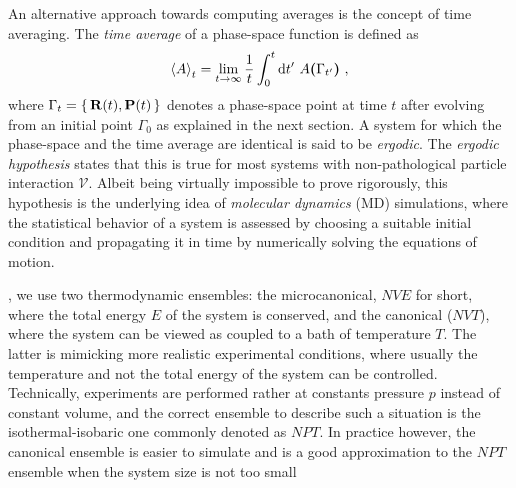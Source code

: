 An alternative approach towards computing averages is the concept of time averaging. The \emph{time average} of a phase-space function is defined as
\begin{align}
  \braket{A}_t
    = \lim\limits_{t \to \infty} \frac{1}{t} \int_0^t \d t' ~ A {\bm (} \Gamma_{t'} {\bm )}~,
  \label{eq:time.average}
\end{align}
where $\Gamma_t = \set{ {\bf R} (t), {\bf P} (t)}$ denotes a phase-space point at time $t$ after evolving from an initial point $\Gamma_0$ as explained in the next section.
A system for which the phase-space and the time average are identical is said to be \emph{ergodic}. The \emph{ergodic hypothesis} states that this is true for most systems with non-pathological particle interaction $\mathcal V$. Albeit being virtually impossible to prove rigorously, this hypothesis is the underlying idea of \emph{molecular dynamics} (MD) simulations, where the statistical behavior of a system is assessed by choosing a suitable initial condition and propagating it in time by numerically solving the equations of motion.

, we use two thermodynamic ensembles: the microcanonical, $NVE$ for short, where the total energy $E$ of the system is conserved, and the canonical ($NVT$), where the system can be viewed as coupled to a bath of temperature $T$. The latter is mimicking more realistic experimental conditions, where usually the temperature and not the total energy of the system can be controlled. Technically, experiments are performed rather at constants pressure $p$ instead of constant volume, and the correct ensemble to describe such a situation is the isothermal-isobaric one commonly denoted as $NPT$. In practice however, the canonical ensemble is easier to simulate and is a good approximation to the $NPT$ ensemble when the system size is not too small~\cite[p.\,134]{Tuckerman}


